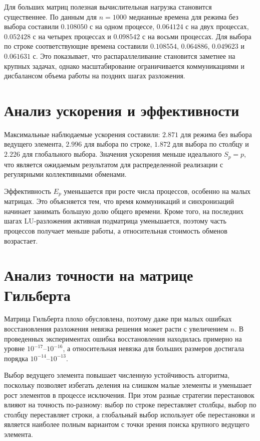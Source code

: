 \documentclass[a4paper,14pt]{extarticle}
\begin{document}
Для больших матриц полезная вычислительная нагрузка становится существеннее. По данным для $n=1000$ медианные времена для режима без выбора составили $0.108050$ с на одном процессе, $0.064124$ с на двух процессах, $0.052428$ с на четырех процессах и $0.098542$ с на восьми процессах. Для выбора по строке соответствующие времена составили $0.108554$, $0.064886$, $0.049623$ и $0.061631$ с. Это показывает, что распараллеливание становится заметнее на крупных задачах, однако масштабирование ограничивается коммуникациями и дисбалансом объема работы на поздних шагах разложения.

\section{Анализ ускорения и эффективности}

Максимальные наблюдаемые ускорения составили: $2.871$ для режима без выбора ведущего элемента, $2.996$ для выбора по строке, $1.872$ для выбора по столбцу и $2.226$ для глобального выбора. Значения ускорения меньше идеального $S_p=p$, что является ожидаемым результатом для распределенной реализации с регулярными коллективными обменами.

Эффективность $E_p$ уменьшается при росте числа процессов, особенно на малых матрицах. Это объясняется тем, что время коммуникаций и синхронизаций начинает занимать большую долю общего времени. Кроме того, на последних шагах LU-разложения активная подматрица уменьшается, поэтому часть процессов получает меньше работы, а относительная стоимость обменов возрастает.

\section{Анализ точности на матрице Гильберта}

Матрица Гильберта плохо обусловлена, поэтому даже при малых ошибках восстановления разложения невязка решения может расти с увеличением $n$. В проведенных экспериментах ошибка восстановления находилась примерно на уровне $10^{-17}$--$10^{-16}$, а относительная невязка для больших размеров достигала порядка $10^{-14}$--$10^{-13}$.

Выбор ведущего элемента повышает численную устойчивость алгоритма, поскольку позволяет избегать деления на слишком малые элементы и уменьшает рост элементов в процессе исключения. При этом разные стратегии перестановок влияют на точность по-разному: выбор по строке переставляет столбцы, выбор по столбцу переставляет строки, а глобальный выбор использует обе перестановки и является наиболее полным вариантом с точки зрения поиска крупного ведущего элемента.
\end{document}
